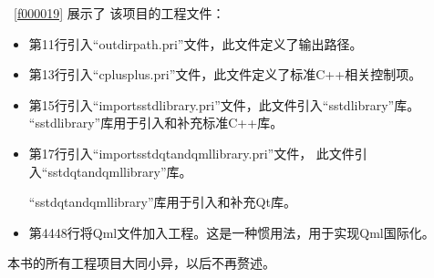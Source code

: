 \lstlistingname\ \ref{f000019}
展示了
该项目的工程文件：

\begin{itemize}
\item 第11行引入“outdirpath.pri”文件，此文件定义了输出路径。
\item 第13行引入“cplusplus.pri”文件，此文件定义了标准C{\sourcefonttwo{}+}{\sourcefonttwo{}+}相关控制项。
\item 第15行引入“import\underline{\hspace{0.5em}}sstd\underline{\hspace{0.5em}}library.pri”文件，此文件引入“sstd\underline{\hspace{0.5em}}library”库。
“sstd\underline{\hspace{0.5em}}library”库用于引入和补充标准C{\sourcefonttwo{}+}{\sourcefonttwo{}+}库。
\item 第17行引入“import\underline{\hspace{0.5em}}sstd\underline{\hspace{0.5em}}qt\underline{\hspace{0.5em}}and\underline{\hspace{0.5em}}qml\underline{\hspace{0.5em}}library.pri”文件，
此文件引入“sstd\underline{\hspace{0.5em}}\-qt\underline{\hspace{0.5em}}\-and\underline{\hspace{0.5em}}\-qml\underline{\hspace{0.5em}}\-library”库。

“sstd\underline{\hspace{0.5em}}qt\underline{\hspace{0.5em}}and\underline{\hspace{0.5em}}qml\underline{\hspace{0.5em}}library”库用于引入和补充Qt库。
\item 第44\raisebox{0.16ex}{\sourcefonttwo\~{}}48行将Qml文件加入工程。这是一种惯用法，用于实现Qml国际化。
\end{itemize}

本书的所有工程项目大同小异，以后不再赘述。

